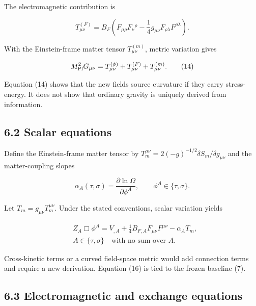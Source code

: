 \documentclass[
  american,
  11pt,
  letterpaper,
]{article}
\begin{document}
The electromagnetic contribution is

\begin{equation}
T^{(F)}_{\mu\nu}=B_F
\left(F_{\mu\rho}F_\nu{}^\rho
-\frac14g_{\mu\nu}F_{\rho\lambda}F^{\rho\lambda}\right).
\tag{13}
\end{equation}

With the Einstein-frame matter tensor \(T^{(m)}_{\mu\nu}\), metric variation gives

\begin{equation}
M_{\rm Pl}^2G_{\mu\nu}
=T^{(\phi)}_{\mu\nu}
+T^{(F)}_{\mu\nu}
+T^{(m)}_{\mu\nu}.
\tag{14}
\end{equation}

Equation (14) shows that the new fields source curvature if they carry stress-energy. It does not show that ordinary gravity is uniquely derived from information.

\subsection{6.2 Scalar equations}\label{scalar-equations}

Define the Einstein-frame matter tensor by \(T_m^{\mu\nu}=2(-g)^{-1/2}\delta S_m/\delta g_{\mu\nu}\) and the matter-coupling slopes

\begin{equation}
\alpha_A(\tau,\sigma)
=\frac{\partial\ln\Omega}{\partial\phi^A},
\qquad \phi^A\in\{\tau,\sigma\}.
\tag{15}
\end{equation}

Let \(T_m=g_{\mu\nu}T_m^{\mu\nu}\). Under the stated conventions, scalar variation yields

\begin{equation}
\begin{aligned}
& Z_A\Box\phi^A
=V_{,A}
+\frac14B_{F,A}F_{\mu\nu}F^{\mu\nu}
-\alpha_A T_m, \\
& A\in\{\tau,\sigma\}\quad\text{with no sum over }A.
\end{aligned}
\tag{16}
\end{equation}

Cross-kinetic terms or a curved field-space metric would add connection terms and require a new derivation. Equation (16) is tied to the frozen baseline (7).

\subsection{6.3 Electromagnetic and exchange equations}\label{electromagnetic-and-exchange-equations}
\end{document}

